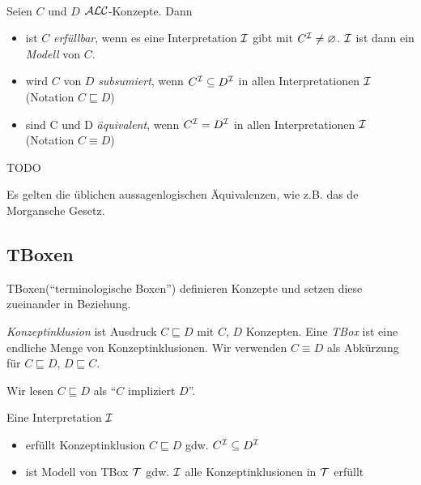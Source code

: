 \begin{definition}
    \mbox{}\\Seien $C$ und $D$ $\mathcal{A}\mathcal{L}\mathcal{C}$-Konzepte. Dann
\begin{itemize}
\item
  ist $C$ \emph{erfüllbar}, wenn es eine Interpretation $\mathcal{I}$ gibt mit
  $C^{\mathcal{I}} \neq \varnothing$. $\mathcal{I}$ ist dann ein \emph{Modell} von
  $C$.
\item
  wird $C$ von $D$ \emph{subsumiert}, wenn $C^{\mathcal{I}} \subseteq D^{\mathcal{I}}$
  in allen Interpretationen $\mathcal{I}$ (Notation $C \sqsubseteq D$)
\item
  sind C und D \emph{äquivalent}, wenn $C^{\mathcal{I}} = D^{\mathcal{I}}$ in allen
  Interpretationen $\mathcal{I}$ (Notation $C \equiv D$)
\end{itemize}
\end{definition}

\begin{tafel}
    TODO
\end{tafel}

Es gelten die üblichen aussagenlogischen Äquivalenzen, wie z.B. das de
Morgansche Gesetz.

\subsection{TBoxen}\label{tboxen}
\label{sec:tbox}

TBoxen(\enquote{terminologische Boxen}) definieren Konzepte und setzen diese zueinander in Beziehung.

\begin{definition}
\emph{Konzeptinklusion} ist Ausdruck $C \sqsubseteq D$ mit $C$, $D$ Konzepten.
Eine \emph{TBox} ist eine endliche Menge von Konzeptinklusionen.  Wir
verwenden $C \equiv D$ als Abkürzung für $C \sqsubseteq D$, $D \sqsubseteq C$.
\end{definition}
Wir lesen $C \sqsubseteq D$ als \enquote{$C$ impliziert $D$}.

\begin{definition} 
Eine Interpretation $\mathcal{I}$
\begin{itemize}
\item
  erfüllt Konzeptinklusion $C \sqsubseteq D$ gdw.
  $C^{\mathcal{I}} \subseteq D^{\mathcal{I}}$
\item
  ist Modell von TBox $\mathcal{T}$ gdw. $\mathcal{I}$ alle Konzeptinklusionen in $\mathcal{T}$
  erfüllt
\end{itemize}
\end{definition}

